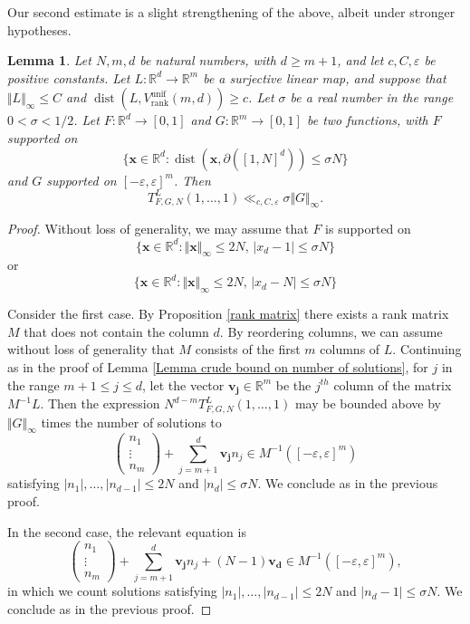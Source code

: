 \documentclass[12pt,a4paper,twoside,reqno]{amsart}
\newtheorem{Lemma}[Theorem]{Lemma}
\newcommand{\rank}{\operatorname{rank}}
\newcommand{\dist}{\operatorname{dist}}
\newcommand{\unif}{\operatorname{unif}}
\numberwithin{equation}{section}
\begin{document}
Our second estimate is a slight strengthening of the above, albeit under stronger hypotheses. 
\begin{Lemma}
\label{Lemma slightly less crude bound on number of solutions}
Let $N,m,d$ be natural numbers, with $d\geqslant m+1$, and let $c,C,\varepsilon$ be positive constants. Let $L:\mathbb{R}^d \longrightarrow \mathbb{R}^m$ be a  surjective linear map, and suppose that $\Vert L \Vert_\infty \leqslant C$ and $\dist (L,V_{\rank}^{\unif}(m,d)) \geqslant c$.  Let $\sigma$ be a real number in the range $0<\sigma < 1/2$. Let $F:\mathbb{R}^d \longrightarrow [0,1]$ and $G:\mathbb{R}^m\longrightarrow [0,1]$ be two functions, with $F$ supported on \[\{\mathbf{x}\in\mathbb{R}^d: \dist(\mathbf{x}, \partial([1,N]^d)) \leqslant \sigma N \}\] and $G$ supported on $[-\varepsilon,\varepsilon]^m$. Then \[ T_{F,G,N}^L(1,\dots,1) \ll_{c,C,\varepsilon} \sigma \Vert G \Vert_\infty.\] 
\end{Lemma}
\begin{proof}
Without loss of generality, we may assume that $F$ is supported on \[\{\mathbf{x}\in\mathbb{R}^d: \Vert\mathbf{x}\Vert_\infty \leqslant 2N, \, \vert x_d - 1\vert \leqslant \sigma N\} \] or \[\{\mathbf{x}\in\mathbb{R}^d: \Vert\mathbf{x}\Vert_\infty \leqslant 2N, \, \vert x_d - N\vert \leqslant \sigma N\} \] 

Consider the first case. By Proposition \ref{rank matrix} there exists a rank matrix $M$ that does not contain the column $d$. By reordering columns, we can assume without loss of generality that $M$ consists of the first $m$ columns of $L$. Continuing as in the proof of Lemma \ref{Lemma crude bound on number of solutions}, for $j$ in the range $m+1\leqslant j\leqslant d$, let the vector $\mathbf{v_{j}} \in\mathbb{R}^m$ be the $j^{th}$ column of the matrix $M^{-1} L$. Then the expression $N^{d-m} T_{F,G,N}^L(1,\dots,1)$ may be bounded above by $\Vert G\Vert_\infty$ times the number of solutions to $$ \left(\begin{matrix} n_1 \\ \vdots\\ n_m \end{matrix}\right) + \sum\limits_{j=m+1}^{d}\mathbf{v_j}n_j \in M^{-1}([-\varepsilon,\varepsilon]^m)$$ satisfying $\vert n_1\vert,\dots,\vert n_{d-1}\vert\leqslant 2N$ and $\vert n_d\vert \leqslant \sigma N$. We conclude as in the previous proof.

In the second case, the relevant equation is \[\left(\begin{matrix} n_1 \\ \vdots\\ n_m \end{matrix}\right) + \sum\limits_{j=m+1}^{d}\mathbf{v_j}n_j + (N-1)\mathbf{v_d} \in M^{-1}([-\varepsilon,\varepsilon]^m),\] in which we count solutions satisfying $\vert n_1\vert,\dots,\vert n_{d-1}\vert\leqslant 2N$ and $\vert n_d - 1\vert \leqslant \sigma N$. We conclude as in the previous proof. 
\end{proof}
\end{document}
